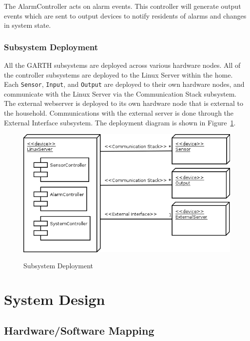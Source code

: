 \documentclass{report}
\begin{document}
The AlarmController acts on alarm events. This controller will
generate output events which are sent to output devices to notify
residents of alarms and changes in system state.

\subsection{Subsystem Deployment}

All the GARTH subsystems are deployed across various hardware
nodes. All of the controller subsystems are deployed to the Linux
Server within the home. Each \texttt{Sensor}, \texttt{Input}, and
\texttt{Output} are deployed to their own hardware nodes, and
communicate with the Linux Server via the Communication Stack
subsystem. The external webserver is deployed to its own hardware node
that is external to the household. Communications with the external
server is done through the External Interface subsystem. The
deployment diagram is shown in Figure~\ref{fig:subsystem_deployment}.

\begin{figure}[hp]
  \centering
  \caption{Subsystem Deployment}
  \includegraphics[scale=0.5]{deployment.png}
  \label{fig:subsystem_deployment}
\end{figure}

\chapter{System Design} %
\label{ch:system-design}

\section{Hardware/Software Mapping}
\end{document}
